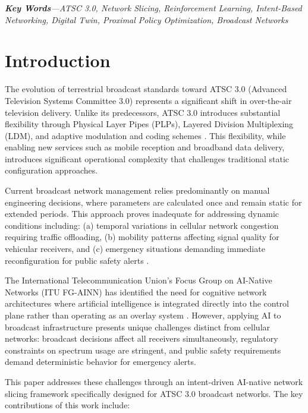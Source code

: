 \documentclass[conference]{IEEEtran}
\begin{document}
\vspace{1em}
\textit{\textbf{Key Words}---ATSC 3.0, Network Slicing, Reinforcement Learning, Intent-Based Networking, Digital Twin, Proximal Policy Optimization, Broadcast Networks}

\section{Introduction}

The evolution of terrestrial broadcast standards toward ATSC 3.0 (Advanced Television Systems Committee 3.0) represents a significant shift in over-the-air television delivery. Unlike its predecessors, ATSC 3.0 introduces substantial flexibility through Physical Layer Pipes (PLPs), Layered Division Multiplexing (LDM), and adaptive modulation and coding schemes \cite{b1}. This flexibility, while enabling new services such as mobile reception and broadband data delivery, introduces significant operational complexity that challenges traditional static configuration approaches.

Current broadcast network management relies predominantly on manual engineering decisions, where parameters are calculated once and remain static for extended periods. This approach proves inadequate for addressing dynamic conditions including: (a) temporal variations in cellular network congestion requiring traffic offloading, (b) mobility patterns affecting signal quality for vehicular receivers, and (c) emergency situations demanding immediate reconfiguration for public safety alerts \cite{b2}.

The International Telecommunication Union's Focus Group on AI-Native Networks (ITU FG-AINN) has identified the need for cognitive network architectures where artificial intelligence is integrated directly into the control plane rather than operating as an overlay system \cite{b3}. However, applying AI to broadcast infrastructure presents unique challenges distinct from cellular networks: broadcast decisions affect all receivers simultaneously, regulatory constraints on spectrum usage are stringent, and public safety requirements demand deterministic behavior for emergency alerts.

This paper addresses these challenges through an intent-driven AI-native network slicing framework specifically designed for ATSC 3.0 broadcast networks. The key contributions of this work include:
\end{document}
